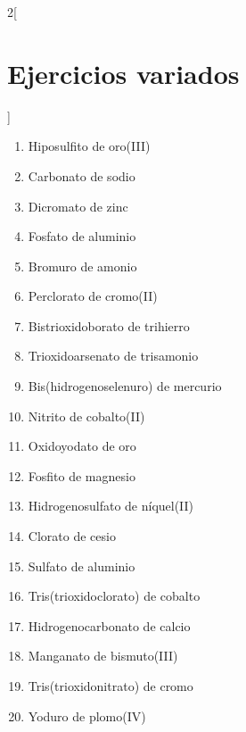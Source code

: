 \documentclass[10pt]{article}
\begin{document}
\begin{multicols*}{2}[
  \section{Ejercicios variados}
  ]
\begin{exercise}[
    tags    = {inorgánica,sales, sales ternarias, oxosales,2B},
    topics  = {química inorgánica,formulación,nomenclatura},
    source  = {Química 2B OXF 2016, p347, e12},
  ]
  \begin{enumerate}
    \item Hiposulfito de oro(III)
    \item Carbonato de sodio
    \item Dicromato de zinc
    \item Fosfato de aluminio
    \item Bromuro de amonio
    \item Perclorato de cromo(II)
    \item Bistrioxidoborato de trihierro
    \item Trioxidoarsenato de trisamonio
    \item Bis(hidrogenoselenuro) de mercurio
    \item Nitrito de cobalto(II)
    \item Oxidoyodato de oro
    \item Fosfito de magnesio
    \item Hidrogenosulfato de níquel(II)
    \item Clorato de cesio
    \item Sulfato de aluminio
    \item Tris(trioxidoclorato) de cobalto
    \item Hidrogenocarbonato de calcio
    \item Manganato de bismuto(III)
    \item Tris(trioxidonitrato) de cromo
    \item Yoduro de plomo(IV)
  \end{enumerate}
\end{exercise}


\end{multicols*}

\end{document}
